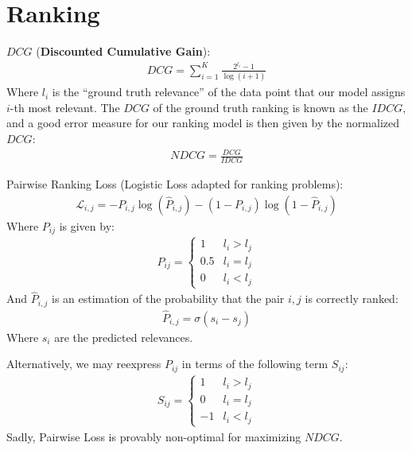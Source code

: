 \documentclass{report}
\newcommand{\tbf}{\textbf}
\newcommand*{\newpar}{\par\vspace{\baselineskip}\noindent}
\newcommand{\loss}{\mathcal{L}}
\begin{document}
\section{Ranking}
$DCG$ (\tbf{Discounted Cumulative Gain}):
\begin{align}
 DCG = \sum_{i=1}^K \frac{2^{l_i} - 1}{\log(i+1)}
\end{align}
Where $l_i$ is the ``ground truth relevance'' of the data point that our model assigns $i$-th most relevant. The $DCG$ of the ground truth ranking is known as the $IDCG$, and a good error measure for our ranking model is then given by the normalized $DCG$:
\begin{align}
NDCG = \frac{DCG}{IDCG}
\end{align}
\newpar
Pairwise Ranking Loss (Logistic Loss adapted for ranking problems):
\begin{align}
 \loss_{i,j} = -P_{i,j} \log(\hat{P}_{i,j}) - (1 - P_{i,j}) \log(1 - \hat{P}_{i,j})
\end{align}
Where $P_{ij}$ is given by:
\begin{align}
 P_{ij} = \begin{cases}
           1 & l_i > l_j\\
           0.5 & l_i = l_j\\
           0 & l_i < l_j
          \end{cases}
\end{align}
And $\hat{P}_{i,j}$ is an estimation of the probability that the pair $i,j$ is correctly ranked:
\begin{align}
 \hat{P}_{i,j} = \sigma(s_i-s_j)
\end{align}
Where $s_i$ are the predicted relevances.
\newpar
Alternatively, we may reexpress $P_{ij}$ in terms of the following term $S_{ij}$:
\begin{align}
 S_{ij} = \begin{cases}
           1 & l_i > l_j\\
           0 & l_i = l_j\\
           -1 & l_i < l_j
          \end{cases}
\end{align}
Sadly, Pairwise Loss is provably non-optimal for maximizing $NDCG$.
\end{document}
